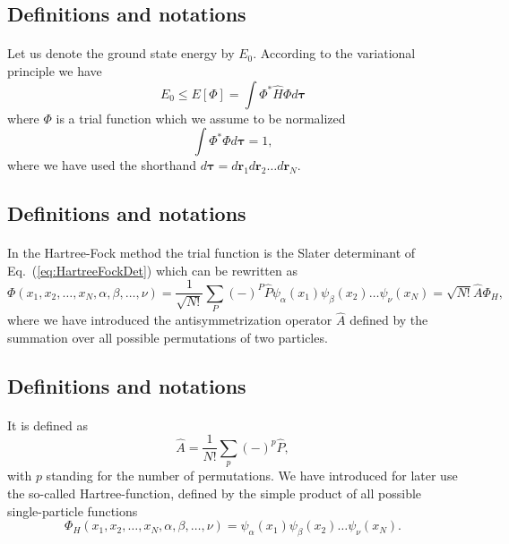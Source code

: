 \documentclass[%
twoside,                 %
final,                   %
10pt]{article}
\begin{document}
\subsection{Definitions and notations}

\paragraph{}
Let us denote the ground state energy by $E_0$. According to the
variational principle we have
\[
  E_0 \le E[\Phi] = \int \Phi^*\hat{H}\Phi d\mathbf{\tau}
\]
where $\Phi$ is a trial function which we assume to be normalized
\[
  \int \Phi^*\Phi d\mathbf{\tau} = 1,
\]
where we have used the shorthand $d\mathbf{\tau}=d\mathbf{r}_1d\mathbf{r}_2\dots d\mathbf{r}_N$.



\subsection{Definitions and notations}

\paragraph{}
In the Hartree-Fock method the trial function is the Slater
determinant of Eq.~(\ref{eq:HartreeFockDet}) which can be rewritten as 
\[
  \Phi(x_1,x_2,\dots,x_N,\alpha,\beta,\dots,\nu) = \frac{1}{\sqrt{N!}}\sum_{P} (-)^P\hat{P}\psi_{\alpha}(x_1)
    \psi_{\beta}(x_2)\dots\psi_{\nu}(x_N)=\sqrt{N!}\hat{A}\Phi_H,
\]
where we have introduced the antisymmetrization operator $\hat{A}$ defined by the 
summation over all possible permutations of two particles.



\subsection{Definitions and notations}

\paragraph{}
It is defined as
\begin{equation}
  \hat{A} = \frac{1}{N!}\sum_{p} (-)^p\hat{P},
\label{antiSymmetryOperator}
\end{equation}
with $p$ standing for the number of permutations. We have introduced for later use the so-called
Hartree-function, defined by the simple product of all possible single-particle functions
\[
  \Phi_H(x_1,x_2,\dots,x_N,\alpha,\beta,\dots,\nu) =
  \psi_{\alpha}(x_1)
    \psi_{\beta}(x_2)\dots\psi_{\nu}(x_N).
\]
\end{document}
